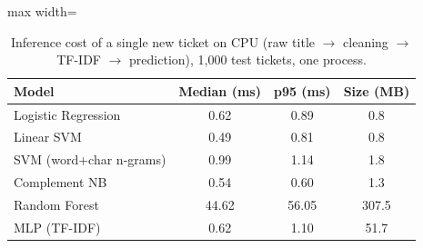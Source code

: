 \begin{table}[!t]
\centering
\caption{Inference cost of a single new ticket on CPU (raw title $\rightarrow$ cleaning $\rightarrow$ TF-IDF $\rightarrow$ prediction), 1,000 test tickets, one process.}
\label{tab:latency}
\footnotesize
\begin{adjustbox}{max width=\columnwidth}
\begin{tabular}{lccc}
\hline
Model & Median (ms) & p95 (ms) & Size (MB) \\
\hline
Logistic Regression & 0.62 & 0.89 & 0.8 \\
Linear SVM & 0.49 & 0.81 & 0.8 \\
SVM (word+char n-grams) & 0.99 & 1.14 & 1.8 \\
Complement NB & 0.54 & 0.60 & 1.3 \\
Random Forest & 44.62 & 56.05 & 307.5 \\
MLP (TF-IDF) & 0.62 & 1.10 & 51.7 \\
\hline
\end{tabular}
\end{adjustbox}
\end{table}
